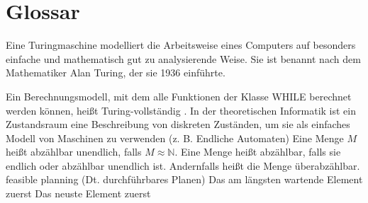 \chapter{Glossar}

		{Eine Turingmaschine modelliert die Arbeitsweise eines Computers auf besonders einfache und mathematisch gut zu analysierende Weise. Sie ist benannt nach dem Mathematiker Alan Turing, der sie 1936 einführte\cite{wiki:01}.}


			{\grqq Ein Berechnungsmodell, mit dem alle Funktionen
	der Klasse WHILE berechnet werden können, heißt
	Turing-vollständig \cite[Definition 5.4]{Schmitz:19}.\grqq{}}
			{In der theoretischen Informatik ist ein Zustandsraum eine Beschreibung von diskreten Zuständen, um sie als einfaches Modell von Maschinen zu verwenden (z. B. Endliche Automaten)\cite{wiki:02}}
	{Eine Menge $M$ heißt abzählbar unendlich, falls $M \approx \mathbb{N}$. Eine Menge heißt abzählbar, falls sie endlich oder abzählbar unendlich ist. Andernfalls heißt die Menge	überabzählbar\cite[Definititon 5.8]{Schmitz:19}.}
 {feasible planning (Dt. durchführbares Planen)}
 {Das am längsten wartende Element zuerst}
 {Das neuste Element zuerst}

